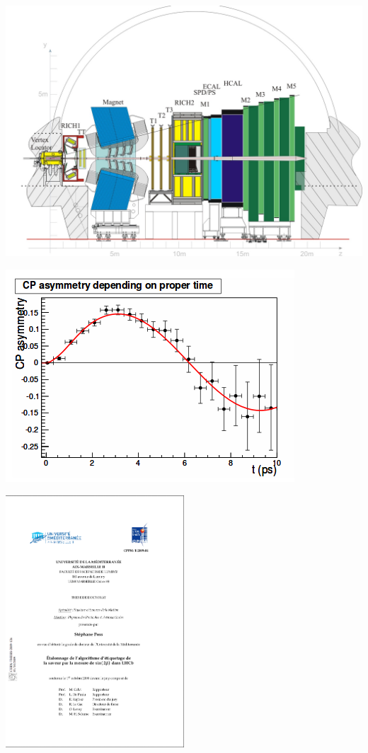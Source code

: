 \documentclass[14pt]{beamer}
\begin{document}
\begin{frame}
\centering
\includegraphics[width=\textwidth]{Lhcbview}
\end{frame}

\begin{frame}
\centering
\includegraphics[width=\textwidth]{CPasymetry}
\end{frame}

\begin{frame}
\centering
\includegraphics[width=0.5\textwidth]{these}

\end{frame}
\end{document}
